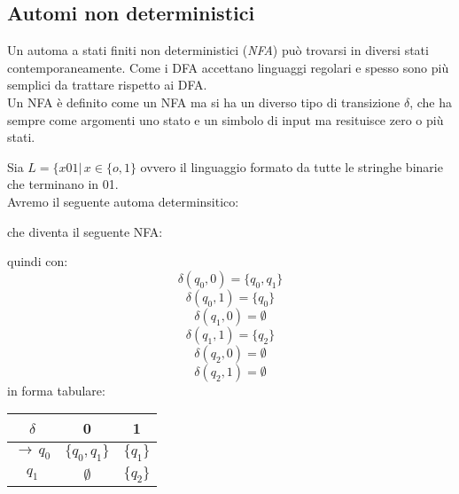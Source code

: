 \subsection{Automi non deterministici}
Un automa a stati finiti non deterministici (\textit{NFA}) può trovarsi in diversi stati contemporaneamente. Come i DFA accettano linguaggi regolari e spesso sono più semplici da trattare rispetto ai DFA.\\
Un NFA è definito come un NFA ma si ha un diverso tipo di transizione $\delta$, che ha sempre come argomenti uno stato e un simbolo di input ma resituisce zero o più stati.
\begin{esempio}
Sia $L=\{x01|\,x\in\{o,1\}$ ovvero il linguaggio formato da tutte le stringhe binarie che terminano in 01.\\
Avremo il seguente automa determinsitico:
\begin{center}
\end{center}
che diventa il seguente NFA:
\begin{center}
\end{center}
quindi con:
$$\delta(q_0,0)=\{q_0,q_1\}$$
$$\delta(q_0,1)=\{q_0\}$$
$$\delta(q_1,0)=\emptyset$$
$$\delta(q_1,1)=\{q_2\}$$
$$\delta(q_2,0)=\emptyset$$
$$\delta(q_2,1)=\emptyset$$
in forma tabulare:
\begin{center}
\begin{tabular}{c|c|c}
$\delta$ & 0 & 1\\
\hline
$\to \,q_0$ & $\{q_0,q_1\}$ & $\{q_1\}$\\
\hline
$q_1$ & $\emptyset$ & $\{q_2\}$\\

\end{tabular}
\end{center}
\end{esempio}

